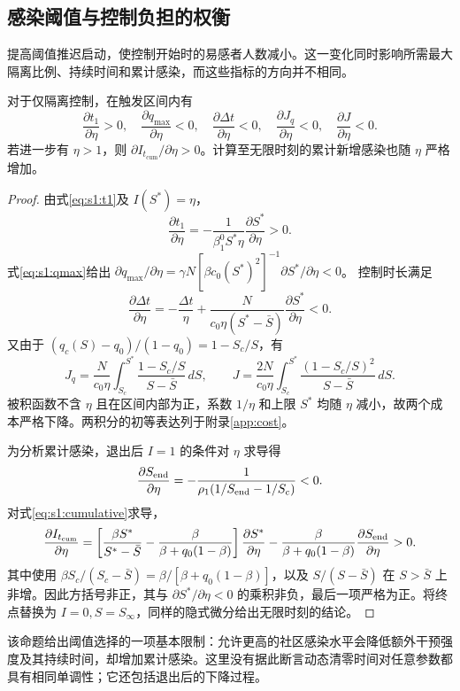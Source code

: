 \documentclass[lang=cn,a4paper,newtx]{elegantpaper}
\numberwithin{equation}{section}
\theoremstyle{plain}
\newcommand{\Itcum}{I_{t_{\mathrm{cum}}}}
\begin{document}
\subsection{感染阈值与控制负担的权衡}
提高阈值推迟启动，使控制开始时的易感者人数减小。这一变化同时影响所需最大隔离比例、持续时间和累计感染，而这些指标的方向并不相同。
\begin{proposition}
\label{prop:threshold-tradeoff}\label{prop:s1:sensitivity}
对于仅隔离控制，在触发区间内有
\begin{equation}
\frac{\partial t_1}{\partial\eta}>0,\quad
\frac{\partial q_{\max}}{\partial\eta}<0,\quad
\frac{\partial\Delta t}{\partial\eta}<0,\quad
\frac{\partial J_q}{\partial\eta}<0,\quad
\frac{\partial J}{\partial\eta}<0.
\label{eq:threshold-tradeoff}
\end{equation}
若进一步有 $\eta>1$，则 $\partial\Itcum/\partial\eta>0$。计算至无限时刻的累计新增感染也随 $\eta$ 严格增加。
\end{proposition}
\begin{proof}
由式\eqref{eq:s1:t1}及 $I(S^*)=\eta$，
\[
\frac{\partial t_1}{\partial\eta}
=-\frac1{\beta_1^0 S^*\eta}\frac{\partial S^*}{\partial\eta}>0.
\]
式\eqref{eq:s1:qmax}给出
$\partial q_{\max}/\partial\eta=\gamma N[\beta c_0(S^*)^2]^{-1}\partial S^*/\partial\eta<0$。
控制时长满足
\[
\frac{\partial\Delta t}{\partial\eta}
=-\frac{\Delta t}{\eta}
+\frac{N}{c_0\eta(S^*-\bar S)}\frac{\partial S^*}{\partial\eta}<0.
\]
又由于 $(q_c(S)-q_0)/(1-q_0)=1-S_c/S$，有
\begin{equation}
J_q=\frac{N}{c_0\eta}\int_{S_c}^{S^*}\frac{1-S_c/S}{S-\bar S}\,dS,
\qquad
J=\frac{2N}{c_0\eta}\int_{S_c}^{S^*}\frac{(1-S_c/S)^2}{S-\bar S}\,dS.
\label{eq:cost:state}
\end{equation}
被积函数不含 $\eta$ 且在区间内部为正，系数 $1/\eta$ 和上限 $S^*$ 均随 $\eta$ 减小，故两个成本严格下降。两积分的初等表达列于附录\ref{app:cost}。

为分析累计感染，退出后 $I=1$ 的条件对 $\eta$ 求导得
\[
\frac{\partial S_{\rm end}}{\partial\eta}
=-\frac1{\rho_1(1/S_{\rm end}-1/S_c)}<0.
\]
对式\eqref{eq:s1:cumulative}求导，
\begin{equation}
\frac{\partial\Itcum}{\partial\eta}
=\left[\frac{\beta S^*}{S^*-\bar S}-\frac{\beta}{\beta+q_0(1-\beta)}\right]\frac{\partial S^*}{\partial\eta}
-\frac{\beta}{\beta+q_0(1-\beta)}\frac{\partial S_{\rm end}}{\partial\eta}>0.
\label{eq:cumulative-eta}
\end{equation}
其中使用 $\beta S_c/(S_c-\bar S)=\beta/[\beta+q_0(1-\beta)]$，以及 $S/(S-\bar S)$ 在 $S>\bar S$ 上非增。因此方括号非正，其与 $\partial S^*/\partial\eta<0$ 的乘积非负，最后一项严格为正。将终点替换为 $I=0,S=S_\infty$，同样的隐式微分给出无限时刻的结论。
\end{proof}
该命题给出阈值选择的一项基本限制：允许更高的社区感染水平会降低额外干预强度及其持续时间，却增加累计感染。这里没有据此断言动态清零时间对任意参数都具有相同单调性；它还包括退出后的下降过程。
\end{document}
